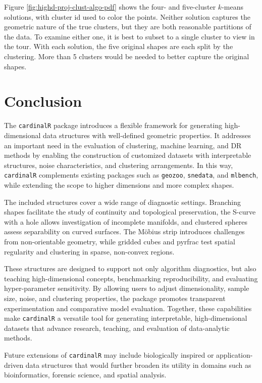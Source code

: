 Figure \ref{fig:highd-proj-clust-algo-pdf} shows the four- and five-cluster \(k\)-means solutions, with cluster id used to color the points. Neither solution captures the geometric nature of the true clusters, but they are both reasonable partitions of the data. To examine either one, it is best to subset to a single cluster to view in the tour. With each solution, the five original shapes are each split by the clustering. More than 5 clusters would be needed to better capture the original shapes.

\section{Conclusion}\label{conclusion}

The \texttt{cardinalR} package introduces a flexible framework for generating high-dimensional data structures with well-defined geometric properties. It addresses an important need in the evaluation of clustering, machine learning, and DR methods by enabling the construction of customized datasets with interpretable structures, noise characteristics, and clustering arrangements. In this way, \texttt{cardinalR} complements existing packages such as \texttt{geozoo}, \texttt{snedata}, and \texttt{mlbench}, while extending the scope to higher dimensions and more complex shapes.

The included structures cover a wide range of diagnostic settings. Branching shapes facilitate the study of continuity and topological preservation, the S-curve with a hole allows investigation of incomplete manifolds, and clustered spheres assess separability on curved surfaces. The Möbius strip introduces challenges from non-orientable geometry, while gridded cubes and pyrfrac test spatial regularity and clustering in sparse, non-convex regions.

These structures are designed to support not only algorithm diagnostics, but also teaching high-dimensional concepts, benchmarking reproducibility, and evaluating hyper-parameter sensitivity. By allowing users to adjust dimensionality, sample size, noise, and clustering properties, the package promotes transparent experimentation and comparative model evaluation. Together, these capabilities make \texttt{cardinalR} a versatile tool for generating interpretable, high-dimensional datasets that advance research, teaching, and evaluation of data-analytic methods.

Future extensions of \texttt{cardinalR} may include biologically inspired or application-driven data structures that would further broaden its utility in domains such as bioinformatics, forensic science, and spatial analysis.

